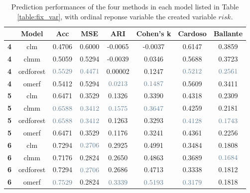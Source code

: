 \begin{table}[H]
    \centering 
    \begin{tabular}{|p{1em} c c c c c c c |}
    \hline
    \rowcolor{bluePoli!40}
    & \textbf{Model} & \textbf{Acc} & \textbf{MSE} & \textbf{ARI} & \textbf{Cohen's k} & \textbf{Cardoso} & \textbf{Ballante} \T\B \\
    \hline \hline
    \textbf{4} & clm & 0.4706 & 0.6000 & -0.0065 & -0.0037 & 0.6147 & 0.3859 \T\B \\
    \textbf{4} & clmm & 0.5059 & 0.5294 & -0.0039 & 0.0346 & 0.5688 & 0.3723 \T\B \\
    \textbf{4} & ordforest & $\textcolor{bluePoli}{0.5529}$ & $\textcolor{bluePoli}{0.4471}$ & 0.00002 & 0.1247 & $\textcolor{bluePoli}{0.5212}$ & $\textcolor{bluePoli}{0.2561}$ \T\B \\
    \textbf{4} & omerf & 0.5412 & 0.5294 & $\textcolor{bluePoli}{0.0213}$  & $\textcolor{bluePoli}{0.1487}$ & 0.5609 & 0.3411 \T\B\\
    \hline
    \textbf{5} & clm & 0.6471 & 0.3529 & 0.1326 & 0.3390 & 0.4318 & 0.2309 \T\B \\
    \textbf{5} & clmm & $\textcolor{bluePoli}{0.6588}$ & $\textcolor{bluePoli}{0.3412}$ & $\textcolor{bluePoli}{0.1575}$ & $\textcolor{bluePoli}{0.3647}$ & 0.4259 & 0.2181 \T\B \\
    \textbf{5} & ordforest & $\textcolor{bluePoli}{0.6588}$ & $\textcolor{bluePoli}{0.3412}$ & 0.1263 & 0.3293 & $\textcolor{bluePoli}{0.4128}$ & $\textcolor{bluePoli}{0.1743}$ \T\B \\
    \textbf{5} & omerf & 0.6471 & 0.3529 & 0.1176 & 0.3241 & 0.4361 & 0.2256 \T\B\\
    \hline
    \textbf{6} & clm & 0.7294 & $\textcolor{bluePoli}{0.2706}$ & 0.2925 & 0.4991 & 0.3484 & 0.1808 \T\B \\
    \textbf{6} & clmm & 0.7176 & 0.2824 & 0.2650 & 0.4863 & 0.3689 & $\textcolor{bluePoli}{0.1684}$ \T\B \\
    \textbf{6} & ordforest & 0.7294 & $\textcolor{bluePoli}{0.2706}$ & 0.2686 & 0.4713 & 0.3338 & 0.1812 \T\B \\
    \textbf{6} & omerf & $\textcolor{bluePoli}{0.7529}$ & 0.2824 & $\textcolor{bluePoli}{0.3339}$ & $\textcolor{bluePoli}{0.5193}$ & $\textcolor{bluePoli}{0.3179}$ & 0.1818 \B\\
    \hline
    \end{tabular}
    \\[10pt]
    \caption{Prediction performances of the four methods in each model listed in Table \ref{table:fix_var}, with ordinal reponse variable the created variable \(risk\).}
    \label{table:res_risk}
\end{table}

